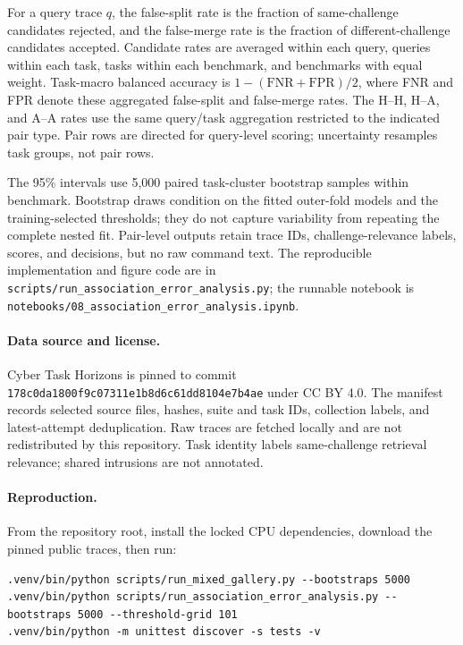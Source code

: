 For a query trace $q$, the false-split rate is the fraction of same-challenge candidates rejected, and the false-merge rate is the fraction of different-challenge candidates accepted. Candidate rates are averaged within each query, queries within each task, tasks within each benchmark, and benchmarks with equal weight. Task-macro balanced accuracy is $1 - (\mathrm{FNR}+\mathrm{FPR})/2$, where FNR and FPR denote these aggregated false-split and false-merge rates. The H--H, H--A, and A--A rates use the same query/task aggregation restricted to the indicated pair type. Pair rows are directed for query-level scoring; uncertainty resamples task groups, not pair rows.

The 95\% intervals use 5,000 paired task-cluster bootstrap samples within benchmark. Bootstrap draws condition on the fitted outer-fold models and the training-selected thresholds; they do not capture variability from repeating the complete nested fit. Pair-level outputs retain trace IDs, challenge-relevance labels, scores, and decisions, but no raw command text. The reproducible implementation and figure code are in \texttt{scripts/run\_association\_error\_analysis.py}; the runnable notebook is \texttt{notebooks/08\_association\_error\_analysis.ipynb}.

\paragraph{Data source and license.} Cyber Task Horizons is pinned to commit \texttt{178c0da1800f9c07311e1b8d6c61dd8104e7b4ae} under CC BY 4.0. The manifest records selected source files, hashes, suite and task IDs, collection labels, and latest-attempt deduplication. Raw traces are fetched locally and are not redistributed by this repository. Task identity labels same-challenge retrieval relevance; shared intrusions are not annotated.

\paragraph{Reproduction.} From the repository root, install the locked CPU dependencies, download the pinned public traces, then run:

\begin{verbatim}
.venv/bin/python scripts/run_mixed_gallery.py --bootstraps 5000
.venv/bin/python scripts/run_association_error_analysis.py --bootstraps 5000 --threshold-grid 101
.venv/bin/python -m unittest discover -s tests -v
\end{verbatim}

